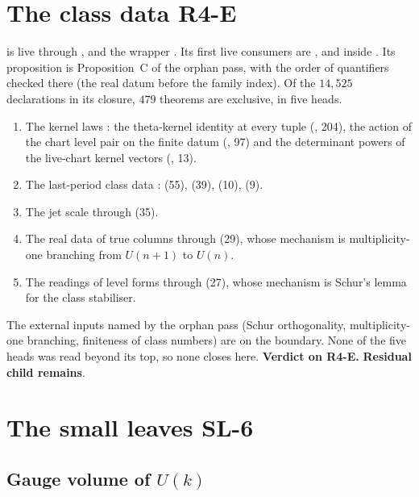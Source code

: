\documentclass[11pt]{article}
\newcommand{\sR}{\textbf{Residual child remains}}
\theoremstyle{remark}
\begin{document}
\section{The class data R4-E}\label{sec:r4e}

 is live through ,  and the wrapper . Its first live consumers are ,  and  inside . Its proposition is Proposition~C of the orphan pass, with the order of quantifiers checked there (the real datum before the family index). Of the $14{,}525$ declarations in its closure, $479$ theorems are exclusive, in five heads.
\begin{enumerate}[nosep,label=E\arabic*.]
\item The kernel laws : the theta-kernel identity at every tuple (, 204), the action of the chart level pair on the finite datum (, 97) and the determinant powers of the live-chart kernel vectors (, 13).
\item The last-period class data :  (55),  (39),  (10),  (9).
\item The jet scale  through  (35).
\item The real data of true columns  through  (29), whose mechanism is multiplicity-one branching from $U(n+1)$ to $U(n)$.
\item The readings of level forms  through  (27), whose mechanism is Schur's lemma for the class stabiliser.
\end{enumerate}
The external inputs named by the orphan pass (Schur orthogonality, multiplicity-one branching, finiteness of class numbers) are on the boundary. None of the five heads was read beyond its top, so none closes here. \textbf{Verdict on R4-E.} \sR.

\section{The small leaves SL-6}\label{sec:sl6}

\subsection{Gauge volume of \texorpdfstring{$U(k)$}{U(k)}}
\end{document}
